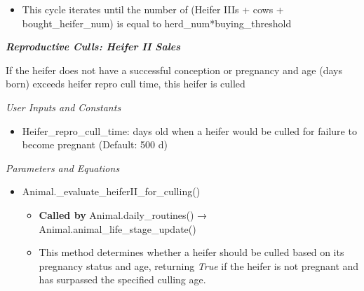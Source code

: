 \begin{refsection}
\begin{itemize}
\begin{itemize}
                \begin{itemize}
                    \item The first animal in the replacement\_market enters the herd, assigned a phosphorus requirement and net merit value, and added to the animals\_added list 
                    \item Number of bought\_heifer\_num is incremented by 1 
                \end{itemize}
                \item This cycle iterates until the number of (Heifer IIIs + cows + bought\_heifer\_num) is equal to herd\_num*buying\_threshold 
            \end{itemize}
         \end{itemize}


    \textbf{\textit{Reproductive Culls: Heifer II Sales}}
    \vspace{0.2cm}

    If the heifer does not have a successful conception or pregnancy and age (days born) exceeds heifer repro cull time, this heifer is culled
        \vspace{0.2cm}
        
         \textit{User Inputs and Constants}
         \vspace{0.1cm}
         
         \begin{itemize}
             \item Heifer\_repro\_cull\_time: days old when a heifer would be culled for failure to become pregnant (Default: 500 d)

         \end{itemize}

         \textit{Parameters and Equations}
         \vspace{0.1cm}

         \begin{itemize}
             \item Animal.\_evaluate\_heiferII\_for\_culling()
            \begin{itemize}
                \item \textbf{Called by} Animal.daily\_routines() → Animal.animal\_life\_stage\_update()
                \item This method determines whether a heifer should be culled based on its pregnancy status and age, returning \textit{True} if the heifer is not pregnant and has surpassed the specified culling age.
            \end{itemize}
         \end{itemize}
        


\end{refsection}
